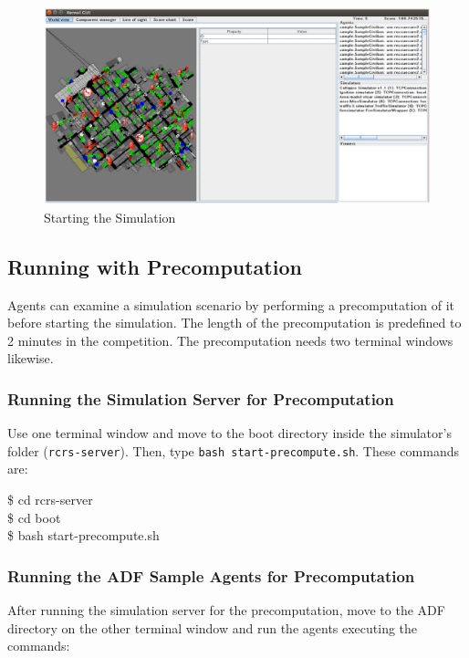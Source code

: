 \documentclass{article}
\begin{document}
\begin{figure}[ht]
 \begin{center}
  \includegraphics[width=1.0\linewidth]{figs/simulator02.eps}
  \caption{Starting the Simulation}
  \label{fig:simulator02}
 \end{center}
\end{figure}
\subsection{Running with Precomputation}
Agents can examine a simulation scenario by performing a precomputation of it before starting the simulation. The length of the precomputation is predefined to 2 minutes in the competition. The precomputation needs two terminal windows likewise.
\subsubsection{Running the Simulation Server for Precomputation}
Use one terminal window and move to the boot directory inside the simulator's folder (\texttt{rcrs-server}). Then, type \texttt{bash start-precompute.sh}. These commands are:

\begin{center}
   \begin{tcolorbox}[title=Running Simulation Server, width=.98\linewidth]
    {\ttfamily
    \$ cd rcrs-server\\
    \$ cd boot\\
    \$ bash start-precompute.sh
    }
  \end{tcolorbox}
\end{center}
\subsubsection{Running the ADF Sample Agents for Precomputation}
After running the simulation server for the precomputation, move to the ADF directory on the other terminal window and run the agents executing the commands:
\end{document}
